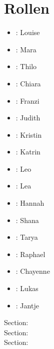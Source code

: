 \pagebreak

\setcounter{section}{-1}
\section{Rollen}
\begin{multicols}{2}
\begin{itemize}
\item \milamh: Louise
\item \miladh: Mara
\item \alberth: Thilo
\item \wilmah: Chiara
\item \wilhelminah: Franzi
\item \salomeh: Judith
\item \cosmah: Kristin
\item \mutterh: Katrin
\item \leonh: Leo
\item \lenah: Lea
\item \charlotteh: Hannah
\item \sophiah: Shana
\item \emmah: Tarya
\item \aaronh: Raphael
\item \cleoh: Chayenne
\item \theoh: Lukas
\item \pikachuh: Jantje
\end{itemize}
\end{multicols}

%


\usehyperlinkstrue
\ListOfPersons

Section: \thesection\\

Section: \thesection\\

Section: \thesection\\



